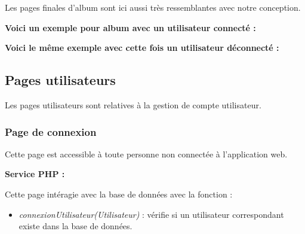         \clearpage
        
			\begin{paragraphe}
                Les pages finales d'album sont ici aussi très ressemblantes avec notre conception.
			\end{paragraphe}

			\begin{paragraphe}
                \textbf{Voici un exemple pour album avec un utilisateur connecté :}
			\end{paragraphe}
            

			\begin{paragraphe}
                \textbf{Voici le même exemple avec cette fois un utilisateur déconnecté :}
			\end{paragraphe}
            

	\clearpage

	\subsection{Pages utilisateurs}
      \begin{paragraphe}
            Les pages utilisateurs sont relatives à la gestion de compte utilisateur.
        \end{paragraphe}

		\subsubsection{Page de connexion}

			\begin{paragraphe}
				Cette page est accessible à toute personne non connectée à l'application web.
			\end{paragraphe}

			\begin{paragraphe}
				\textbf{Service PHP :}
			\end{paragraphe}

			\begin{paragraphe}
			    Cette page intéragie avec la base de données avec la fonction :
				\begin{itemize}
					\item \emph{connexionUtilisateur(Utilisateur)} : vérifie si un utilisateur correspondant existe dans la base de données.
				\end{itemize}
			\end{paragraphe}

